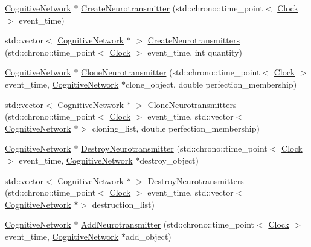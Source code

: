 \begin{DoxyCompactItemize}
\item 
\hyperlink{class_cognitive_network}{Cognitive\+Network} $\ast$ \hyperlink{class_neuroreceptor_af671059884336eadbc367f9d8556eb3f}{Create\+Neurotransmitter} (std\+::chrono\+::time\+\_\+point$<$ \hyperlink{universe_8h_a0ef8d951d1ca5ab3cfaf7ab4c7a6fd80}{Clock} $>$ event\+\_\+time)
\item 
std\+::vector$<$ \hyperlink{class_cognitive_network}{Cognitive\+Network} $\ast$ $>$ \hyperlink{class_neuroreceptor_aa0037379ecb214ff982429e054f2a194}{Create\+Neurotransmitters} (std\+::chrono\+::time\+\_\+point$<$ \hyperlink{universe_8h_a0ef8d951d1ca5ab3cfaf7ab4c7a6fd80}{Clock} $>$ event\+\_\+time, int quantity)
\item 
\hyperlink{class_cognitive_network}{Cognitive\+Network} $\ast$ \hyperlink{class_neuroreceptor_a5629a3d463cc963138ff017ec499720d}{Clone\+Neurotransmitter} (std\+::chrono\+::time\+\_\+point$<$ \hyperlink{universe_8h_a0ef8d951d1ca5ab3cfaf7ab4c7a6fd80}{Clock} $>$ event\+\_\+time, \hyperlink{class_cognitive_network}{Cognitive\+Network} $\ast$clone\+\_\+object, double perfection\+\_\+membership)
\item 
std\+::vector$<$ \hyperlink{class_cognitive_network}{Cognitive\+Network} $\ast$ $>$ \hyperlink{class_neuroreceptor_af953abb478f4a3a1843b4b61f9969274}{Clone\+Neurotransmitters} (std\+::chrono\+::time\+\_\+point$<$ \hyperlink{universe_8h_a0ef8d951d1ca5ab3cfaf7ab4c7a6fd80}{Clock} $>$ event\+\_\+time, std\+::vector$<$ \hyperlink{class_cognitive_network}{Cognitive\+Network} $\ast$$>$ cloning\+\_\+list, double perfection\+\_\+membership)
\item 
\hyperlink{class_cognitive_network}{Cognitive\+Network} $\ast$ \hyperlink{class_neuroreceptor_a35beb8e355f9b567b327e9323f5552a0}{Destroy\+Neurotransmitter} (std\+::chrono\+::time\+\_\+point$<$ \hyperlink{universe_8h_a0ef8d951d1ca5ab3cfaf7ab4c7a6fd80}{Clock} $>$ event\+\_\+time, \hyperlink{class_cognitive_network}{Cognitive\+Network} $\ast$destroy\+\_\+object)
\item 
std\+::vector$<$ \hyperlink{class_cognitive_network}{Cognitive\+Network} $\ast$ $>$ \hyperlink{class_neuroreceptor_acd500abfb25bd08167b2002e85e8b788}{Destroy\+Neurotransmitters} (std\+::chrono\+::time\+\_\+point$<$ \hyperlink{universe_8h_a0ef8d951d1ca5ab3cfaf7ab4c7a6fd80}{Clock} $>$ event\+\_\+time, std\+::vector$<$ \hyperlink{class_cognitive_network}{Cognitive\+Network} $\ast$$>$ destruction\+\_\+list)
\item 
\hyperlink{class_cognitive_network}{Cognitive\+Network} $\ast$ \hyperlink{class_neuroreceptor_a900b21f6feb6334d4ff8a3fd5244bf05}{Add\+Neurotransmitter} (std\+::chrono\+::time\+\_\+point$<$ \hyperlink{universe_8h_a0ef8d951d1ca5ab3cfaf7ab4c7a6fd80}{Clock} $>$ event\+\_\+time, \hyperlink{class_cognitive_network}{Cognitive\+Network} $\ast$add\+\_\+object)

\end{DoxyCompactItemize}
